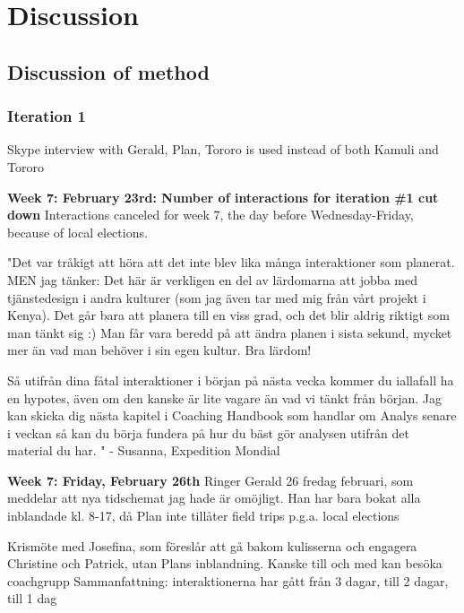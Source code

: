 \chapter{Discussion}\label{cha:discussion}


\section{Discussion of method}

\subsection{Iteration 1}
Skype interview with Gerald, Plan, Tororo is used instead of both Kamuli and Tororo

\textbf{Week 7: February 23rd: Number of interactions for iteration \#1 cut down}
Interactions canceled for week 7, the day before Wednesday-Friday, because of local elections.

"Det var tråkigt att höra att det inte blev lika många interaktioner som planerat.
MEN jag tänker: Det här är verkligen en del av lärdomarna att jobba med tjänstedesign i andra kulturer (som jag även tar med mig från vårt projekt i Kenya). Det går bara att planera till en viss grad, och det blir aldrig riktigt som man tänkt sig :) Man får vara beredd på att ändra planen i sista sekund, mycket mer än vad man behöver i sin egen kultur. Bra lärdom!

Så utifrån dina fåtal interaktioner i början på nästa vecka kommer du iallafall ha en hypotes, även om den kanske är lite vagare än vad vi tänkt från början. Jag kan skicka dig nästa kapitel i Coaching Handbook som handlar om Analys senare i veckan så kan du börja fundera på hur du bäst gör analysen utifrån det material du har. " - Susanna, Expedition Mondial

\textbf{Week 7: Friday, February 26th}
Ringer Gerald 26 fredag februari, som meddelar att nya tidschemat jag hade är omöjligt. Han har bara bokat alla inblandade kl. 8-17, då Plan inte tillåter field trips p.g.a. local elections

Krismöte med Josefina, som föreslår att gå bakom kulisserna och engagera Christine och Patrick, utan Plans inblandning. Kanske till och med kan besöka coachgrupp
Sammanfattning: interaktionerna har gått från 3 dagar, till 2 dagar, till 1 dag

